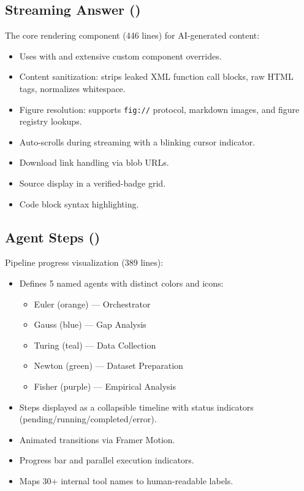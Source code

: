 \subsection{Streaming Answer ()}

The core rendering component (446 lines) for AI-generated content:

\begin{itemize}
  \item Uses  with  and extensive custom component overrides.
  \item Content sanitization: strips leaked XML function call blocks, raw HTML tags, normalizes whitespace.
  \item Figure resolution: supports \texttt{fig://} protocol, markdown images, and figure registry lookups.
  \item Auto-scrolls during streaming with a blinking cursor indicator.
  \item Download link handling via blob URLs.
  \item Source display in a verified-badge grid.
  \item Code block syntax highlighting.
\end{itemize}

\subsection{Agent Steps ()}

Pipeline progress visualization (389 lines):

\begin{itemize}
  \item Defines 5 named agents with distinct colors and icons:
  \begin{itemize}
    \item Euler (orange) --- Orchestrator
    \item Gauss (blue) --- Gap Analysis
    \item Turing (teal) --- Data Collection
    \item Newton (green) --- Dataset Preparation
    \item Fisher (purple) --- Empirical Analysis
  \end{itemize}
  \item Steps displayed as a collapsible timeline with status indicators (pending/running/completed/error).
  \item Animated transitions via Framer Motion.
  \item Progress bar and parallel execution indicators.
  \item Maps 30+ internal tool names to human-readable labels.
\end{itemize}

